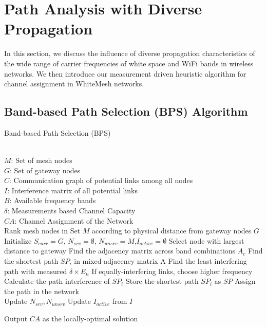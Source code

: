 \section{Path Analysis with Diverse Propagation}
\label{sec:wmalgorithms}


In this section, we discuss the influence of diverse propagation
characteristics of the wide range of carrier frequencies of
white space and WiFi bands in wireless networks. 
We then introduce our measurement driven heuristic algorithm 
for channel assignment in WhiteMesh networks.



\subsection{Band-based Path Selection (BPS) Algorithm}
\label{subsec:BPS}

\begin{algorithm}[t]
    \small
\caption{Band-based Path Selection (BPS)}
\label{algorithms:bps}
\begin{algorithmic}[1]
\REQUIRE  ~~\\
	$M$: Set of mesh nodes\\
	$G$: Set of gateway nodes\\
	$C$: Communication graph of potential links among all nodes\\
	$I$: Interference matrix of all potential links \\
	$B$: Available frequency bands \\
	$\delta$: Measurements based Channel Capacity
\ENSURE ~~\\    
$CA$: Channel Assignment of the Network\\
\STATE Rank mesh nodes in Set $M$ according to physical distance from gateway nodes $G$
\STATE Initialize $S_{curr}=G$, $N_{srv}=\emptyset$, $N_{unsrv}=M$,$I_{active}=\emptyset$
\STATE Select node with largest distance to gateway
\STATE Find the adjacency matrix across band combinations $A_c$
\STATE Find the shortest path $SP_i$ in mixed adjacency matrix A 
\STATE Find the least interfering path with measured $\delta \times E_n$
\STATE If equally-interfering links, choose higher frequency
\STATE Calculate the path interference of $SP_i$
\ENDFOR
\STATE Store the shortest path $SP_i$ as $SP$
\ENDFOR
\STATE Assign the path in the network\\
		\STATE Update $N_{srv},N_{unsrv}$
		\STATE Update $I_{active}$ from $I$
\ENDWHILE 

Output $CA$ as the locally-optimal solution\\
\end{algorithmic}
\end{algorithm}

